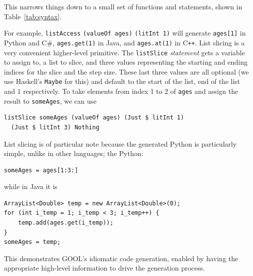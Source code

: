 \documentclass[sigplan,review,prologue,dvipsnames]{acmart}
\newcommand{\Csharp}{C\#}
\newcommand{\Cplusplus}{C\texttt{++}}
\begin{document}
This narrows things down to a small set of functions and statements, shown in 
Table~\ref{tab:syntax}.

For example, \verb|listAccess| \verb|(valueOf ages)| \verb|(litInt 1)| will 
generate
\verb|ages[1]| in Python and \Csharp, \verb|ages.get(1)| in Java, and
\verb|ages.at(1)| in \Cplusplus.  List slicing is a very convenient
higher-level primitive.  The \verb|listSlice| \emph{statement} gets
a variable to assign to, a list to slice, and three
values representing the starting and ending indices for the slice and the step
size. These last three values are all optional (we use Haskell's \verb|Maybe|
for this) and default to the start of the list, end of the list and $1$
respectively.  To take elements from index 1 to 2 of \verb|ages| and
assign the result to \verb|someAges|, we can use
\begin{lstlisting}
listSlice someAges (valueOf ages) (Just $ litInt 1) 
  (Just $ litInt 3) Nothing
\end{lstlisting}
List slicing is of particular note because the generated Python is particularly
simple, unlike in other languages; the Python:
\begin{lstlisting}
someAges = ages[1:3:]
\end{lstlisting}
while in Java it is
\begin{lstlisting}
ArrayList<Double> temp = new ArrayList<Double>(0);
for (int i_temp = 1; i_temp < 3; i_temp++) {
    temp.add(ages.get(i_temp));
}
someAges = temp;
\end{lstlisting}
This demonstrates GOOL's idiomatic code generation, enabled by having the
appropriate high-level information to drive the generation process.
\end{document}
